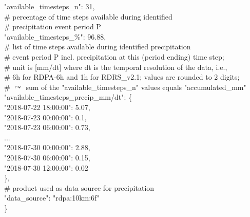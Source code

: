 \documentclass[10pt,a4paper,titlepage,parskip]{scrartcl}
\newenvironment{ttfont}{\fontfamily{\ttdefault}\selectfont}{\par}
\newcommand{\GRAU}[1]{\textcolor{ufzgray2}{#1}}
\begin{document}
\begin{framed}
\begin{ttfont}
\begin{tabbing}
				\> "available\_timesteps\_n": 31,  \\
				\> \GRAU{\# percentage of time steps available during identified }\\
				\> \GRAU{\# precipitation event period P}\\
				\> "available\_timesteps\_\%": 96.88,  \\
				\> \GRAU{\# list of time steps available during identified precipitation}\\
				\> \GRAU{\# event period P incl. precipitation at this (period ending) time step; }\\
				\> \GRAU{\# unit is [mm/dt] where dt is the temporal resolution of the data, i.e.,}\\
				\> \GRAU{\# 6h for RDPA-6h and 1h for RDRS\_v2.1; values are rounded to 2 digits;}\\
				\> \GRAU{\# $\curvearrowright$ sum of the "available\_timesteps\_n" values equals "accumulated\_mm"}\\
				\> "available\_timesteps\_precip\_mm/dt": \{ \\
				\> \> 	"2018-07-22 18:00:00": 5.07,  \\
				\> \> 	"2018-07-23 00:00:00": 0.1,  \\
				\> \> 	"2018-07-23 06:00:00": 0.73,  \\
				\> \> 	...  \\
				\> \> 	"2018-07-30 00:00:00": 2.88,  \\
				\> \> 	"2018-07-30 06:00:00": 0.15,  \\
				\> \> 	"2018-07-30 12:00:00": 0.02  \\
				\> \},  \\
				\> \GRAU{\# product used as data source for precipitation}\\
				\> "data\_source": "rdpa:10km:6f" \\
			\} \\
		\end{tabbing}
	\end{ttfont}
	\vspace*{-0.3cm}
\end{framed}
\vspace*{-0.3cm}
\end{document}

